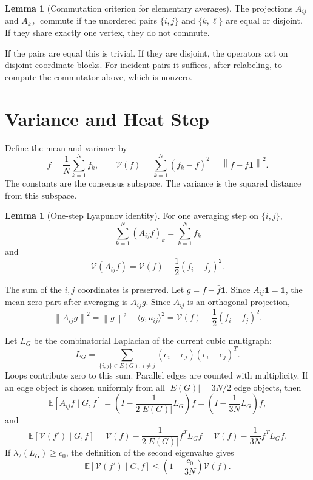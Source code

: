 \documentclass[11pt]{article}
\makeatletter
\newcommand{\E}{\mathbb E}
\newcommand{\V}{\mathcal V}
\newcommand{\one}{\mathbf 1}
\newcommand{\ip}[2]{\langle #1,#2\rangle}
\newcommand{\norm}[1]{\left\|#1\right\|}
\theoremstyle{definition}
\newtheorem{lemma}[theorem]{Lemma}
\renewenvironment{proof}[1][\proofname]{\par
  \pushQED{\qed}%
  \normalfont \topsep6\p@\@plus6\p@\relax
  \trivlist
  \item[\hskip\labelsep\bfseries #1\@addpunct{.}]\ignorespaces
}{%
  \popQED\endtrivlist\@endpefalse
}
\makeatother
\begin{document}
\begin{lemma}[Commutation criterion for elementary averages]
The projections $A_{ij}$ and $A_{k\ell}$ commute if the unordered pairs
$\{i,j\}$ and $\{k,\ell\}$ are equal or disjoint.  If they share exactly one
vertex, they do not commute.
\end{lemma}

\begin{proof}
If the pairs are equal this is trivial.  If they are disjoint, the operators
act on disjoint coordinate blocks.  For incident pairs it suffices, after
relabeling, to compute the commutator above, which is nonzero.
\end{proof}

\section{Variance and Heat Step}

Define the mean and variance by
\[
    \bar f=\frac1N\sum_{k=1}^N f_k,
    \qquad
    \V(f)=\sum_{k=1}^N(f_k-\bar f)^2
    =
    \norm{f-\bar f\one}^2.
\]
The constants are the consensus subspace.  The variance is the squared distance
from this subspace.

\begin{lemma}[One-step Lyapunov identity]
For one averaging step on $\{i,j\}$,
\[
    \sum_{k=1}^N(A_{ij}f)_k=\sum_{k=1}^Nf_k
\]
and
\[
    \V(A_{ij}f)=\V(f)-\frac12(f_i-f_j)^2.
\]
\end{lemma}

\begin{proof}
The sum of the $i,j$ coordinates is preserved.  Let $g=f-\bar f\one$.  Since
$A_{ij}\one=\one$, the mean-zero part after averaging is $A_{ij}g$.  Since
$A_{ij}$ is an orthogonal projection,
\[
    \norm{A_{ij}g}^2
    =
    \norm{g}^2-\ip{g}{u_{ij}}^2
    =
    \V(f)-\frac12(f_i-f_j)^2.
\]
\end{proof}

Let $L_G$ be the combinatorial Laplacian of the current cubic multigraph:
\[
    L_G=\sum_{\{i,j\}\in E(G),\,i\neq j}
    (e_i-e_j)(e_i-e_j)^T.
\]
Loops contribute zero to this sum.  Parallel edges are counted with
multiplicity.  If an edge object is chosen uniformly from all $|E(G)|=3N/2$
edge objects, then
\[
    \E[A_{ij}f\mid G,f]
    =
    \left(I-\frac{1}{2|E(G)|}L_G\right)f
    =
    \left(I-\frac{1}{3N}L_G\right)f,
\]
and
\[
    \E[\V(f')\mid G,f]
    =
    \V(f)-\frac{1}{2|E(G)|}f^TL_Gf
    =
    \V(f)-\frac{1}{3N}f^TL_Gf.
\]
If $\lambda_2(L_G)\ge c_0$, the definition of the second eigenvalue gives
\[
    \E[\V(f')\mid G,f]
    \le
    \left(1-\frac{c_0}{3N}\right)\V(f).
\]
\end{document}

